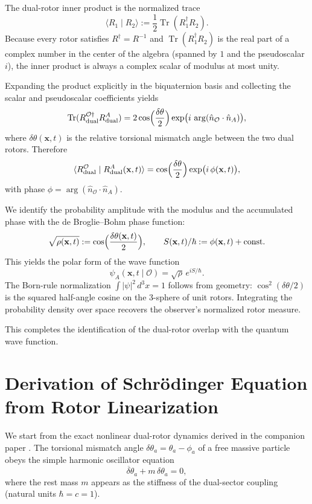 \documentclass[dvipdfmx,a4paper]{article}
\begin{document}
The dual-rotor inner product is the normalized trace
\[
\langle R_1 \mid R_2 \rangle := \frac12 \operatorname{Tr}(R_1^\dagger R_2).
\]
Because every rotor satisfies \(R^\dagger = R^{-1}\) and \(\operatorname{Tr}(R_1^\dagger R_2)\) is the real part of a complex number in the center of the algebra (spanned by \(1\) and the pseudoscalar \(i\)), the inner product is always a complex scalar of modulus at most unity.

Expanding the product explicitly in the biquaternion basis and collecting the scalar and pseudoscalar coefficients yields
\[
\operatorname{Tr}(R_{\text{dual}}^{\mathcal{O}\dagger} R_{\text{dual}}^A) = 2\cos\Bigl(\frac{\delta\theta}{2}\Bigr)\exp\bigl(i\,\arg(\hat{n}_{\mathcal{O}}\cdot\hat{n}_A)\bigr),
\]
where \(\delta\theta(\mathbf{x},t)\) is the relative torsional mismatch angle between the two dual rotors. Therefore
\[
\langle R_{\text{dual}}^{\mathcal{O}} \mid R_{\text{dual}}^{A}(\mathbf{x},t) \rangle = \cos\Bigl(\frac{\delta\theta}{2}\Bigr)\exp\bigl(i\,\phi(\mathbf{x},t)\bigr),
\]
with phase \(\phi = \arg(\hat{n}_{\mathcal{O}}\cdot\hat{n}_A)\).

We identify the probability amplitude with the modulus and the accumulated phase with the de Broglie–Bohm phase function:
\[
\sqrt{\rho(\mathbf{x},t)} := \cos\Bigl(\frac{\delta\theta(\mathbf{x},t)}{2}\Bigr),\qquad
S(\mathbf{x},t)/\hbar := \phi(\mathbf{x},t) + \text{const}.
\]
This yields the polar form of the wave function
\[
\psi_A(\mathbf{x},t\mid\mathcal{O}) = \sqrt{\rho}\,e^{i S/\hbar}.
\]
The Born-rule normalization \(\int|\psi|^2\,d^3x=1\) follows from geometry: \(\cos^2(\delta\theta/2)\) is the squared half-angle cosine on the 3-sphere of unit rotors. Integrating the probability density over space recovers the observer’s normalized rotor measure.

This completes the identification of the dual-rotor overlap with the quantum wave function.

\section{Derivation of Schrödinger Equation from Rotor Linearization}

We start from the exact nonlinear dual-rotor dynamics derived in the companion paper \cite{dst-dynamic-equation}. The torsional mismatch angle \(\delta\theta_a = \theta_a - \phi_a\) of a free massive particle obeys the simple harmonic oscillator equation
\[
\ddot{\delta\theta}_a + m\,\delta\theta_a = 0,
\]
where the rest mass \(m\) appears as the stiffness of the dual-sector coupling (natural units \(\hbar = c = 1\)).
\end{document}
